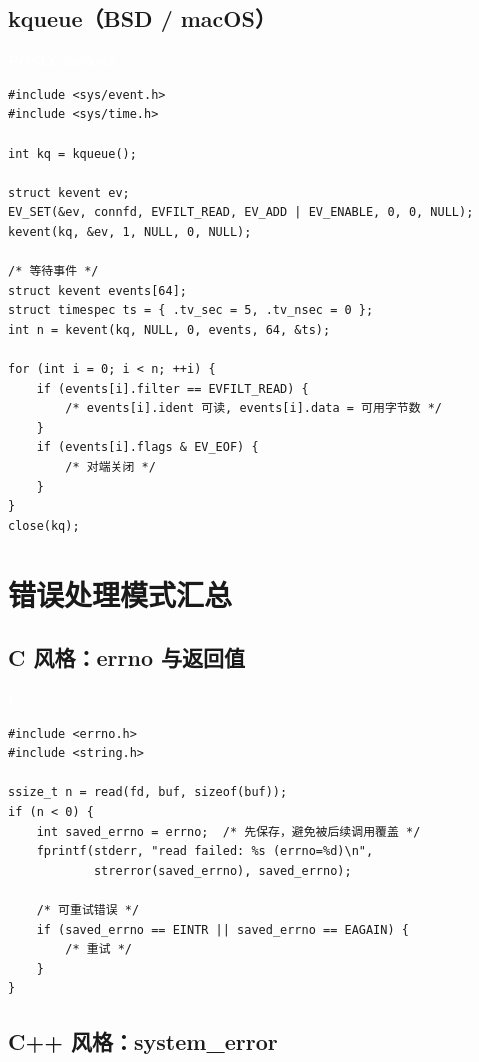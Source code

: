 \documentclass[12pt,a4paper,fontset=fandol]{ctexbook}
\newcommand{\clabel}{%
  \noindent\begin{tcolorbox}[sharp corners,colback=fileheadbg,colframe=fileheadbg,
    left=6pt,right=6pt,top=2pt,bottom=2pt,boxrule=0pt]
  \textcolor{white}{\small\bfseries\sffamily C}\end{tcolorbox}%
}
\newcommand{\posixlabel}{%
  \noindent\begin{tcolorbox}[sharp corners,colback=posixheadbg,colframe=posixheadbg,
    left=6pt,right=6pt,top=2pt,bottom=2pt,boxrule=0pt]
  \textcolor{white}{\small\bfseries\sffamily POSIX Sockets}\end{tcolorbox}%
}
\begin{document}
\section{kqueue（BSD / macOS）}

\posixlabel
\begin{lstlisting}[style=cstyle]
#include <sys/event.h>
#include <sys/time.h>

int kq = kqueue();

struct kevent ev;
EV_SET(&ev, connfd, EVFILT_READ, EV_ADD | EV_ENABLE, 0, 0, NULL);
kevent(kq, &ev, 1, NULL, 0, NULL);

/* 等待事件 */
struct kevent events[64];
struct timespec ts = { .tv_sec = 5, .tv_nsec = 0 };
int n = kevent(kq, NULL, 0, events, 64, &ts);

for (int i = 0; i < n; ++i) {
    if (events[i].filter == EVFILT_READ) {
        /* events[i].ident 可读, events[i].data = 可用字节数 */
    }
    if (events[i].flags & EV_EOF) {
        /* 对端关闭 */
    }
}
close(kq);
\end{lstlisting}

\chapter{错误处理模式汇总}

\section{C 风格：errno 与返回值}

\clabel
\begin{lstlisting}[style=cstyle]
#include <errno.h>
#include <string.h>

ssize_t n = read(fd, buf, sizeof(buf));
if (n < 0) {
    int saved_errno = errno;  /* 先保存，避免被后续调用覆盖 */
    fprintf(stderr, "read failed: %s (errno=%d)\n",
            strerror(saved_errno), saved_errno);

    /* 可重试错误 */
    if (saved_errno == EINTR || saved_errno == EAGAIN) {
        /* 重试 */
    }
}
\end{lstlisting}

\section{C++ 风格：system\_error}
\end{document}

